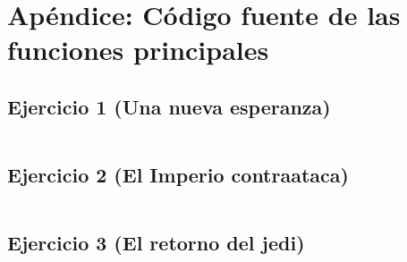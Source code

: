 \section{Apéndice: Código fuente de las funciones principales}\label{sec:codigo}

\subsection{Ejercicio 1 (Una nueva esperanza)}
\begin{lstlisting}
\end{lstlisting}

\subsection{Ejercicio 2 (El Imperio contraataca)}
\begin{lstlisting}
\end{lstlisting}

\subsection{Ejercicio 3 (El retorno del jedi)}
\begin{lstlisting}
\end{lstlisting}
